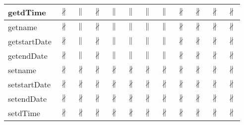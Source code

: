 \documentclass[10pt]{article}
\begin{document}
\begin{longtable}{|l|l|l|l|l|l|l|l|l|l|l|l|}
\hline
getdTime&{\color{BrickRed}$\nparallel$}&{\color{blue}$\parallel$}&{\color{BrickRed}$\nparallel$}&{\color{blue}$\parallel$}&{\color{blue}$\parallel$}&{\color{blue}$\parallel$}&{\color{blue}$\parallel$}&{\color{BrickRed}$\nparallel$}&{\color{BrickRed}$\nparallel$}&{\color{BrickRed}$\nparallel$}&{\color{BrickRed}$\nparallel$}\\
\hline
getname&{\color{BrickRed}$\nparallel$}&{\color{blue}$\parallel$}&{\color{BrickRed}$\nparallel$}&{\color{blue}$\parallel$}&{\color{blue}$\parallel$}&{\color{blue}$\parallel$}&{\color{blue}$\parallel$}&{\color{BrickRed}$\nparallel$}&{\color{BrickRed}$\nparallel$}&{\color{BrickRed}$\nparallel$}&{\color{BrickRed}$\nparallel$}\\
\hline
getstartDate&{\color{BrickRed}$\nparallel$}&{\color{blue}$\parallel$}&{\color{BrickRed}$\nparallel$}&{\color{blue}$\parallel$}&{\color{blue}$\parallel$}&{\color{blue}$\parallel$}&{\color{blue}$\parallel$}&{\color{BrickRed}$\nparallel$}&{\color{BrickRed}$\nparallel$}&{\color{BrickRed}$\nparallel$}&{\color{BrickRed}$\nparallel$}\\
\hline
getendDate&{\color{BrickRed}$\nparallel$}&{\color{blue}$\parallel$}&{\color{BrickRed}$\nparallel$}&{\color{blue}$\parallel$}&{\color{blue}$\parallel$}&{\color{blue}$\parallel$}&{\color{blue}$\parallel$}&{\color{BrickRed}$\nparallel$}&{\color{BrickRed}$\nparallel$}&{\color{BrickRed}$\nparallel$}&{\color{BrickRed}$\nparallel$}\\
\hline
setname&{\color{BrickRed}$\nparallel$}&{\color{BrickRed}$\nparallel$}&{\color{BrickRed}$\nparallel$}&{\color{BrickRed}$\nparallel$}&{\color{BrickRed}$\nparallel$}&{\color{BrickRed}$\nparallel$}&{\color{BrickRed}$\nparallel$}&{\color{BrickRed}$\nparallel$}&{\color{BrickRed}$\nparallel$}&{\color{BrickRed}$\nparallel$}&{\color{BrickRed}$\nparallel$}\\
\hline
setstartDate&{\color{BrickRed}$\nparallel$}&{\color{BrickRed}$\nparallel$}&{\color{BrickRed}$\nparallel$}&{\color{BrickRed}$\nparallel$}&{\color{BrickRed}$\nparallel$}&{\color{BrickRed}$\nparallel$}&{\color{BrickRed}$\nparallel$}&{\color{BrickRed}$\nparallel$}&{\color{BrickRed}$\nparallel$}&{\color{BrickRed}$\nparallel$}&{\color{BrickRed}$\nparallel$}\\
\hline
setendDate&{\color{BrickRed}$\nparallel$}&{\color{BrickRed}$\nparallel$}&{\color{BrickRed}$\nparallel$}&{\color{BrickRed}$\nparallel$}&{\color{BrickRed}$\nparallel$}&{\color{BrickRed}$\nparallel$}&{\color{BrickRed}$\nparallel$}&{\color{BrickRed}$\nparallel$}&{\color{BrickRed}$\nparallel$}&{\color{BrickRed}$\nparallel$}&{\color{BrickRed}$\nparallel$}\\
\hline
setdTime&{\color{BrickRed}$\nparallel$}&{\color{BrickRed}$\nparallel$}&{\color{BrickRed}$\nparallel$}&{\color{BrickRed}$\nparallel$}&{\color{BrickRed}$\nparallel$}&{\color{BrickRed}$\nparallel$}&{\color{BrickRed}$\nparallel$}&{\color{BrickRed}$\nparallel$}&{\color{BrickRed}$\nparallel$}&{\color{BrickRed}$\nparallel$}&{\color{BrickRed}$\nparallel$}\\
\hline
\end{longtable}
\newpage
\end{document}
